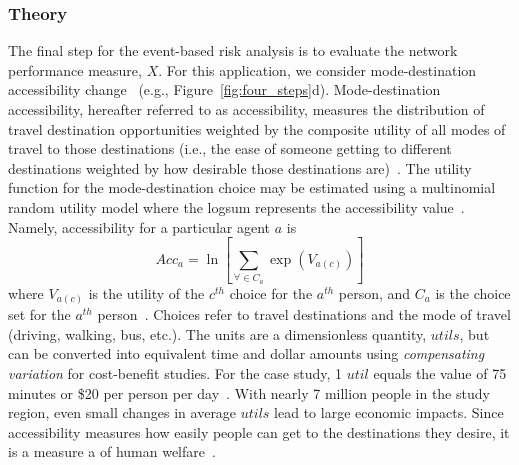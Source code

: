 \subsubsection{Theory}
The final step for the event-based risk analysis is to evaluate the network performance measure, $X$. For this application, we consider  mode-destination accessibility change~\cite[e.g.,][]{geurs_accessibility_2004,kockelman_travel_1997,waddell_incorporating_2002}  (e.g., Figure~\ref{fig:four_steps}{d}). Mode-destination accessibility, hereafter referred to as accessibility, measures the distribution of travel destination opportunities weighted by the composite utility of all modes of travel to those destinations (i.e., the ease of someone getting to different destinations weighted by how desirable those destinations are)~\cite{handy_measuring_1997,niemeier_accessibility:_1997}. The utility function for the mode-destination choice may be estimated using a multinomial random utility model where the logsum represents the accessibility value~\cite{manski_structural_1981,handy_measuring_1997,niemeier_accessibility:_1997}. Namely, accessibility for a particular agent $a$ is
\begin{equation}
Acc_a = \ln \left[ \sum_{\forall \in C_a} \exp (V_{a(c)}) \right]
\label{eq:acc}
\end{equation}
where $V_{a(c)}$ is the utility of the $c^{th}$ choice for the $a^{th}$ person, and $C_a$ is the choice set for the $a^{th}$ person~\cite{handy_measuring_1997}. Choices refer to travel destinations and the mode of travel (driving, walking, bus, etc.). The units are a dimensionless quantity, $utils$, but can be converted into equivalent time and dollar amounts using \emph{compensating variation} for cost-benefit studies. For the case study, 1 $util$ equals the value of 75 minutes or \$20 per person per day~\cite{niemeier_accessibility:_1997,small_applied_1981,ory_personal_2013,united_states_department_of_transportation_revised_2011}. With nearly 7 million people in the study region, even small changes in average $utils$ lead to large economic impacts. Since accessibility measures how easily people can get to the destinations they desire, it is a measure a of human welfare~\cite[e.g.,][]{niemeier_accessibility:_1997}.


